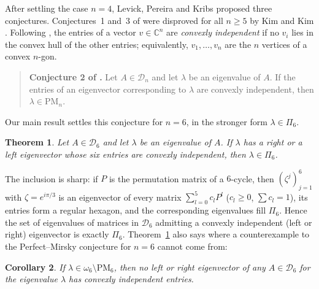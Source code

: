 \documentclass[11pt]{amsart}
\newtheorem{theorem}{Theorem}[section]
\newtheorem{corollary}[theorem]{Corollary}
\theoremstyle{definition}
\theoremstyle{remark}
\newcommand{\C}{\mathbb{C}}
\newcommand{\cD}{\mathcal{D}}
\newcommand{\PM}{\mathrm{PM}}
\begin{document}
After settling the case $n=4$, Levick, Pereira and Kribs \cite{LPK15} proposed three conjectures. Conjectures~1 and~3 of \cite{LPK15} were disproved for all $n\ge5$ by Kim and Kim \cite{KK22}. Following \cite[Definition~2]{LPK15}, the entries of a vector $v\in\C^n$ are \emph{convexly independent} if no $v_i$ lies in the convex hull of the other entries; equivalently, $v_1,\dots,v_n$ are the $n$ vertices of a convex $n$-gon.

\begin{quote}
\textbf{Conjecture 2 of \cite{LPK15}.} Let $A\in\cD_n$ and let $\lambda$ be an eigenvalue of $A$. If the entries of an eigenvector corresponding to $\lambda$ are convexly independent, then $\lambda\in\PM_n$.
\end{quote}

Our main result settles this conjecture for $n=6$, in the stronger form $\lambda\in\Pi_6$.

\begin{theorem}\label{thm:main}
Let $A\in\cD_6$ and let $\lambda$ be an eigenvalue of $A$. If $\lambda$ has a right or a left eigenvector whose six entries are convexly independent, then $\lambda\in\Pi_6$.
\end{theorem}

The inclusion is sharp: if $P$ is the permutation matrix of a $6$-cycle, then $(\zeta^j)_{j=1}^6$ with $\zeta=e^{i\pi/3}$ is an eigenvector of every matrix $\sum_{l=0}^{5}c_lP^l$ ($c_l\ge0$, $\sum c_l=1$), its entries form a regular hexagon, and the corresponding eigenvalues fill $\Pi_6$. Hence the set of eigenvalues of matrices in $\cD_6$ admitting a convexly independent (left or right) eigenvector is exactly $\Pi_6$. Theorem~\ref{thm:main} also says where a counterexample to the Perfect--Mirsky conjecture for $n=6$ cannot come from:

\begin{corollary}\label{cor:pm}
If $\lambda\in\omega_6\setminus\PM_6$, then no left or right eigenvector of any $A\in\cD_6$ for the eigenvalue $\lambda$ has convexly independent entries.
\end{corollary}
\end{document}
